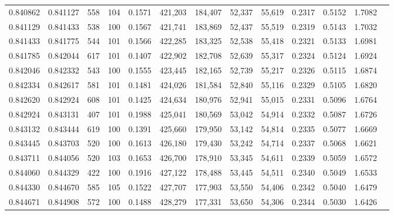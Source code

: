 \begin{tabular}{rrrrrrrrrrrrr}
0.840862 & 0.841127 &   558 & 104 &                                     0.1571 & 421,203 & 184,407 &  52,337 &  55,619 & 0.2317 & 0.5152 & 1.7082 \\
0.841129 & 0.841433 &   538 & 100 &                                     0.1567 & 421,741 & 183,869 &  52,437 &  55,519 & 0.2319 & 0.5143 & 1.7032 \\
0.841433 & 0.841775 &   544 & 101 &                                     0.1566 & 422,285 & 183,325 &  52,538 &  55,418 & 0.2321 & 0.5133 & 1.6981 \\
0.841785 & 0.842044 &   617 & 101 &                                     0.1407 & 422,902 & 182,708 &  52,639 &  55,317 & 0.2324 & 0.5124 & 1.6924 \\
0.842046 & 0.842332 &   543 & 100 &                                     0.1555 & 423,445 & 182,165 &  52,739 &  55,217 & 0.2326 & 0.5115 & 1.6874 \\
0.842334 & 0.842617 &   581 & 101 &                                     0.1481 & 424,026 & 181,584 &  52,840 &  55,116 & 0.2329 & 0.5105 & 1.6820 \\
0.842620 & 0.842924 &   608 & 101 &                                     0.1425 & 424,634 & 180,976 &  52,941 &  55,015 & 0.2331 & 0.5096 & 1.6764 \\
0.842924 & 0.843131 &   407 & 101 &                                     0.1988 & 425,041 & 180,569 &  53,042 &  54,914 & 0.2332 & 0.5087 & 1.6726 \\
0.843132 & 0.843444 &   619 & 100 &                                     0.1391 & 425,660 & 179,950 &  53,142 &  54,814 & 0.2335 & 0.5077 & 1.6669 \\
0.843445 & 0.843703 &   520 & 100 &                                     0.1613 & 426,180 & 179,430 &  53,242 &  54,714 & 0.2337 & 0.5068 & 1.6621 \\
0.843711 & 0.844056 &   520 & 103 &                                     0.1653 & 426,700 & 178,910 &  53,345 &  54,611 & 0.2339 & 0.5059 & 1.6572 \\
0.844060 & 0.844329 &   422 & 100 &                                     0.1916 & 427,122 & 178,488 &  53,445 &  54,511 & 0.2340 & 0.5049 & 1.6533 \\
0.844330 & 0.844670 &   585 & 105 &                                     0.1522 & 427,707 & 177,903 &  53,550 &  54,406 & 0.2342 & 0.5040 & 1.6479 \\
0.844671 & 0.844908 &   572 & 100 &                                     0.1488 & 428,279 & 177,331 &  53,650 &  54,306 & 0.2344 & 0.5030 & 1.6426 \\

\end{tabular}
